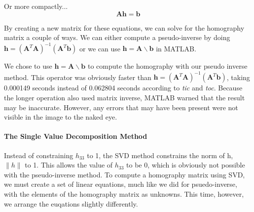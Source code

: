 \documentclass[11pt, letterpaper]{article}
\begin{document}
Or more compactly...
\[
\mathbf{A}\mathbf{h}=\mathbf{b}
\]

By creating a new matrix for these equations, we can solve for the
homography matrix a couple of ways. We can either compute a
pseudo-inverse by doing
$\mathbf{h}=(\mathbf{A}^T\mathbf{A})^{-1}(\mathbf{A}^T\mathbf{b})$ or
we can use $\mathbf{h}=\mathbf{A}\backslash\mathbf{b}$ in MATLAB.

We chose to use $\mathbf{h}=\mathbf{A}\backslash\mathbf{b}$ to compute
the homography with our pseudo inverse method. This operator was
obviously faster than
$\mathbf{h}=(\mathbf{A}^T\mathbf{A})^{-1}(\mathbf{A}^T\mathbf{b})$,
taking 0.000149 seconds instead of 0.062804 seconds according to
\emph{tic} and \emph{toc}. Because the longer operation also used
matrix inverse, MATLAB warned that the result may be
inaccurate. However, any errors that may have been present were not
visible in the image to the naked eye.

\paragraph{The Single Value Decomposition Method}
Instead of constraining $h_{33}$ to 1, the SVD method constrains the
norm of h, $\|h\|$ to 1. This allows the value of $h_{33}$ to be 0,
which is obviously not possible with the pseudo-inverse method. To
compute a homography matrix using SVD, we must create a set of linear
equations, much like we did for psuedo-inverse, with the elements of
the homography matrix as unknowns. This time, however, we arrange the
euqations slightly differently.
\end{document}
